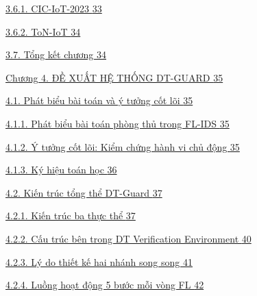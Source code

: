 \hyperref[cic-iot-2023]{3.6.1. CIC-IoT-2023 \hyperref[cic-iot-2023]{33}}

\hyperref[ton-iot]{3.6.2. ToN-IoT \hyperref[ton-iot]{34}}

\hyperref[tux1ed5ng-kux1ebft-chux1b0ux1a1ng-1]{3.7. Tổng kết chương \hyperref[tux1ed5ng-kux1ebft-chux1b0ux1a1ng-1]{34}}

\hyperref[chux1b0ux1a1ng-4.-ux111ux1ec1-xuux1ea5t-hux1ec7-thux1ed1ng-dt-guard]{Chương 4. ĐỀ XUẤT HỆ THỐNG DT-GUARD \hyperref[chux1b0ux1a1ng-4.-ux111ux1ec1-xuux1ea5t-hux1ec7-thux1ed1ng-dt-guard]{35}}

\hyperref[phuxe1t-biux1ec3u-buxe0i-touxe1n-vuxe0-uxfd-tux1b0ux1edfng-cux1ed1t-luxf5i]{4.1. Phát biểu bài toán và ý tưởng cốt lõi \hyperref[phuxe1t-biux1ec3u-buxe0i-touxe1n-vuxe0-uxfd-tux1b0ux1edfng-cux1ed1t-luxf5i]{35}}

\hyperref[phuxe1t-biux1ec3u-buxe0i-touxe1n-phuxf2ng-thux1ee7-trong-fl-ids]{4.1.1. Phát biểu bài toán phòng thủ trong FL-IDS \hyperref[phuxe1t-biux1ec3u-buxe0i-touxe1n-phuxf2ng-thux1ee7-trong-fl-ids]{35}}

\hyperref[uxfd-tux1b0ux1edfng-cux1ed1t-luxf5i-kiux1ec3m-chux1ee9ng-huxe0nh-vi-chux1ee7-ux111ux1ed9ng]{4.1.2. Ý tưởng cốt lõi: Kiểm chứng hành vi chủ động \hyperref[uxfd-tux1b0ux1edfng-cux1ed1t-luxf5i-kiux1ec3m-chux1ee9ng-huxe0nh-vi-chux1ee7-ux111ux1ed9ng]{35}}

\hyperref[kuxfd-hiux1ec7u-touxe1n-hux1ecdc]{4.1.3. Ký hiệu toán học \hyperref[kuxfd-hiux1ec7u-touxe1n-hux1ecdc]{36}}

\hyperref[kiux1ebfn-truxfac-tux1ed5ng-thux1ec3-dt-guard]{4.2. Kiến trúc tổng thể DT-Guard \hyperref[kiux1ebfn-truxfac-tux1ed5ng-thux1ec3-dt-guard]{37}}

\hyperref[kiux1ebfn-truxfac-ba-thux1ef1c-thux1ec3]{4.2.1. Kiến trúc ba thực thể \hyperref[kiux1ebfn-truxfac-ba-thux1ef1c-thux1ec3]{37}}

\hyperref[cux1ea5u-truxfac-buxean-trong-dt-verification-environment]{4.2.2. Cấu trúc bên trong DT Verification Environment \hyperref[cux1ea5u-truxfac-buxean-trong-dt-verification-environment]{40}}

\hyperref[luxfd-do-thiux1ebft-kux1ebf-hai-nhuxe1nh-song-song]{4.2.3. Lý do thiết kế hai nhánh song song \hyperref[luxfd-do-thiux1ebft-kux1ebf-hai-nhuxe1nh-song-song]{41}}

\hyperref[luux1ed3ng-houx1ea1t-ux111ux1ed9ng-5-bux1b0ux1edbc-mux1ed7i-vuxf2ng-fl]{4.2.4. Luồng hoạt động 5 bước mỗi vòng FL \hyperref[luux1ed3ng-houx1ea1t-ux111ux1ed9ng-5-bux1b0ux1edbc-mux1ed7i-vuxf2ng-fl]{42}}

